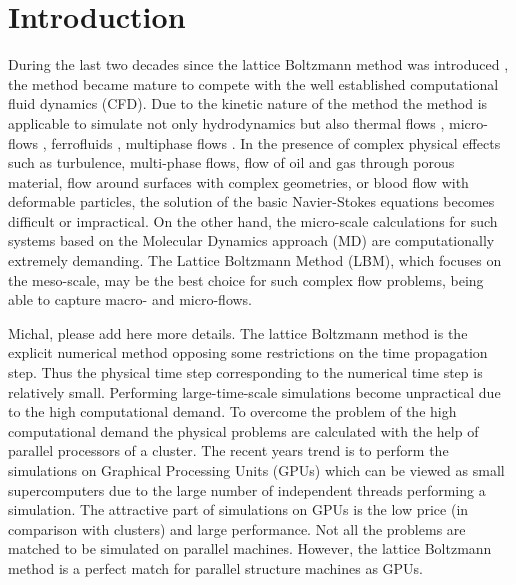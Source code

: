 \documentclass[mathpazo,sort,numbers]{cicp}
\begin{document}


\maketitle


\section{Introduction}
\label{sec:introduction}
During the last two decades since the lattice Boltzmann method was introduced \cite{mcnamara}, the method became mature to compete with the well established computational fluid dynamics (CFD). Due to the kinetic nature of the method the method is applicable to simulate not only hydrodynamics but also thermal flows \cite{karlin-minimalmodels,yuan-thermal}, micro-flows \cite{ansumali-small-knudsen}, ferrofluids \cite{rosensweig,kuzmin-aniso}, multiphase flows \cite{rothman-color,Shan-chen:extended,swift}. In the presence of complex physical effects such as turbulence, multi-phase flows, flow of oil and gas through porous material, flow around surfaces with complex geometries, or blood flow with deformable particles, the solution of the basic Navier-Stokes equations becomes difficult or impractical. On the other hand, the micro-scale calculations for such systems based on the  Molecular Dynamics approach (MD) are computationally extremely demanding.  The Lattice Boltzmann Method (LBM), which focuses on the meso-scale, may be the best choice for such complex flow problems, being able to capture macro- and micro-flows.

{\color{red} Michal, please add here more details.}
The lattice Boltzmann method is the explicit numerical method opposing some restrictions on the time propagation step. Thus the physical time step corresponding to the numerical time step is relatively small. Performing large-time-scale simulations become unpractical due to the high computational demand. To overcome the problem of the high computational demand the physical problems are calculated with the help of parallel processors of a cluster. The recent years trend is to perform the simulations on Graphical Processing Units (GPUs) which can be viewed as small supercomputers due to the large number of independent threads performing a simulation. The attractive part of simulations on GPUs is the low price (in comparison with clusters) and large performance. Not all the problems are matched to be simulated on parallel machines. However, the lattice Boltzmann method is a perfect match for parallel structure machines as GPUs. 
\end{document}

